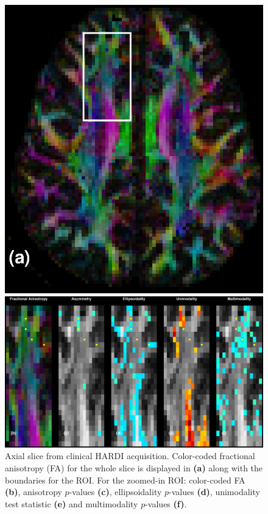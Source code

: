 \documentclass[dvips,aoas,preprint]{imsart}
\numberwithin{equation}{section}
\theoremstyle{plain}
\begin{document}
\begin{figure}[!htbp]
    \begin{minipage}[]{0.45\textwidth}
      \centering
      \includegraphics*[width=\textwidth]{slice2_slice+rect.eps}
    \end{minipage}
    \begin{minipage}[]{\textwidth}
      \centering      
      \includegraphics*[width=.85\textwidth]{slice2_statistics+points.eps}
    \end{minipage}
  \caption{Axial slice from clinical HARDI acquisition.  Color-coded
    fractional anisotropy (FA) for the whole slice is displayed in
    {\bf (a)} along with the boundaries for the ROI.  For the
    zoomed-in ROI: color-coded FA {\bf (b)}, anisotropy $p$-values
    {\bf (c)}, ellipsoidality $p$-values {\bf (d)}, unimodality test
    statistic {\bf (e)} and multimodality $p$-values {\bf (f)}.
  \label{figure-slice2}}
\end{figure}
\end{document}
